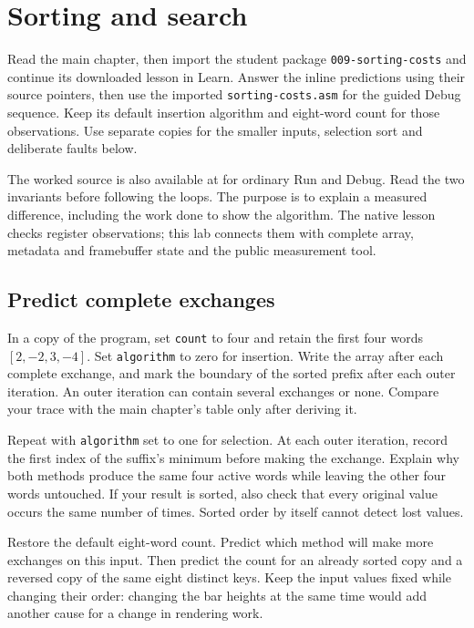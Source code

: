 \chapter{Sorting and search}
\label{revision-lab:algorithms-and-cost}

Read the main chapter, then import the student package
\texttt{009-sorting-costs} and continue its downloaded lesson in Learn. Answer
the inline predictions using their source pointers, then use the imported
\texttt{sorting-costs.asm} for the guided Debug sequence. Keep its default
insertion algorithm and eight-word count for those observations. Use separate
copies for the smaller inputs, selection sort and deliberate faults below.

The worked source is also available at
 for ordinary Run and Debug. Read
the two invariants before following the loops. The purpose is to explain a
measured difference, including the work done to show the algorithm. The native
lesson checks register observations; this lab connects them with complete array,
metadata and framebuffer state and the public measurement tool.

\section{Predict complete exchanges}

In a copy of the program, set \texttt{count} to four and retain the first four
words $[2,-2,3,-4]$. Set \texttt{algorithm} to zero for insertion. Write the
array after each complete exchange, and mark the boundary of the sorted prefix
after each outer iteration. An outer iteration can contain several exchanges
or none. Compare your trace with the main chapter's table only after deriving it.

Repeat with \texttt{algorithm} set to one for selection. At each outer iteration,
record the first index of the suffix's minimum before making the exchange. Explain
why both methods produce the same four active words while leaving the other four
words untouched. If your result is sorted, also check that every original value
occurs the same number of times. Sorted order by itself cannot detect lost values.

Restore the default eight-word count. Predict which method will make more exchanges
on this input. Then predict the count for an already sorted copy and a reversed
copy of the same eight distinct keys. Keep the input values fixed while changing
their order: changing the bar heights at the same time would add another cause
for a change in rendering work.

